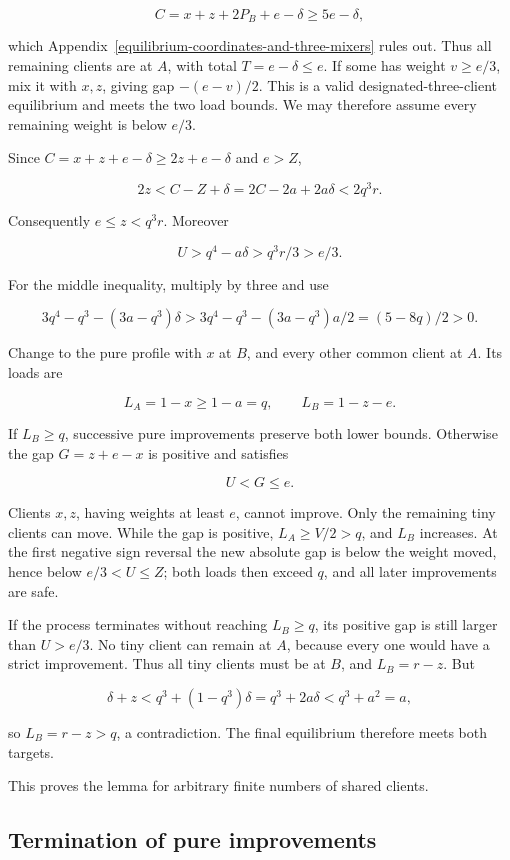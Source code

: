 \documentclass[11pt]{amsart}
\numberwithin{equation}{section}
\theoremstyle{definition}
\begin{document}
\[
C=x+z+2P_B+e-\delta\ge5e-\delta,
\]

which Appendix~\ref{equilibrium-coordinates-and-three-mixers} rules out. Thus all remaining clients are at \(A\), with total \(T=e-\delta\le e\). If some has weight \(v\ge e/3\), mix it with \(x,z\), giving gap \(-(e-v)/2\). This is a valid designated-three-client equilibrium and meets the two load bounds. We may therefore assume every remaining weight is below \(e/3\).

Since \(C=x+z+e-\delta\ge2z+e-\delta\) and \(e>Z\),

\[
2z<C-Z+\delta=2C-2a+2a\delta<2q^3r.
\]

Consequently \(e\le z<q^3r\). Moreover

\[
U>q^4-a\delta>q^3r/3>e/3.
\]

For the middle inequality, multiply by three and use

\[
3q^4-q^3-(3a-q^3)\delta>
3q^4-q^3-(3a-q^3)a/2=(5-8q)/2>0.
\]

Change to the pure profile with \(x\) at \(B\), and every other common client at \(A\). Its loads are

\[
L_A=1-x\ge1-a=q,\qquad L_B=1-z-e.
\]

If \(L_B\ge q\), successive pure improvements preserve both lower bounds. Otherwise the gap \(G=z+e-x\) is positive and satisfies

\[
U<G\le e.
\]

Clients \(x,z\), having weights at least \(e\), cannot improve. Only the remaining tiny clients can move. While the gap is positive, \(L_A\ge V/2>q\), and \(L_B\) increases. At the first negative sign reversal the new absolute gap is below the weight moved, hence below \(e/3<U\le Z\); both loads then exceed \(q\), and all later improvements are safe.

If the process terminates without reaching \(L_B\ge q\), its positive gap is still larger than \(U>e/3\). No tiny client can remain at \(A\), because every one would have a strict improvement. Thus all tiny clients must be at \(B\), and \(L_B=r-z\). But

\[
\delta+z<q^3+(1-q^3)\delta
=q^3+2a\delta<q^3+a^2=a,
\]

so \(L_B=r-z>q\), a contradiction. The final equilibrium therefore meets both targets.

This proves the lemma for arbitrary finite numbers of shared clients.

\subsection{Termination of pure improvements}
\end{document}

